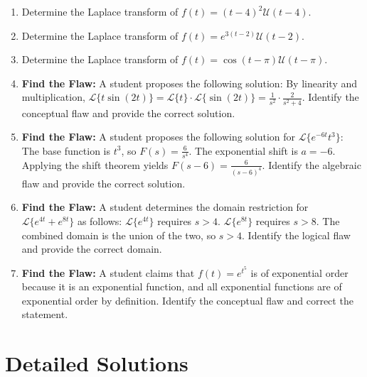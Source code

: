\documentclass[11pt, letterpaper]{article}
\theoremstyle{definition}
\theoremstyle{remark}
\begin{document}
\begin{enumerate}[label=\textbf{Problem \arabic*.}, leftmargin=*]
    \item Determine the Laplace transform of $f(t) = (t-4)^2 \mathcal{U}(t-4)$.
    
    \item Determine the Laplace transform of $f(t) = e^{3(t-2)} \mathcal{U}(t-2)$.
    
    \item Determine the Laplace transform of $f(t) = \cos(t-\pi) \mathcal{U}(t-\pi)$.
    
    \item \textbf{Find the Flaw:} A student proposes the following solution: 
    By linearity and multiplication, $\mathscr{L}\{t \sin(2t)\} = \mathscr{L}\{t\} \cdot \mathscr{L}\{\sin(2t)\} = \frac{1}{s^2} \cdot \frac{2}{s^2+4}$. 
    Identify the conceptual flaw and provide the correct solution.
    
    \item \textbf{Find the Flaw:} A student proposes the following solution for $\mathscr{L}\{e^{-6t} t^3\}$: 
    The base function is $t^3$, so $F(s) = \frac{6}{s^4}$. The exponential shift is $a = -6$. Applying the shift theorem yields $F(s-6) = \frac{6}{(s-6)^4}$. 
    Identify the algebraic flaw and provide the correct solution.
    
    \item \textbf{Find the Flaw:} A student determines the domain restriction for $\mathscr{L}\{e^{4t} + e^{8t}\}$ as follows: 
    $\mathscr{L}\{e^{4t}\}$ requires $s > 4$. $\mathscr{L}\{e^{8t}\}$ requires $s > 8$. The combined domain is the union of the two, so $s > 4$. 
    Identify the logical flaw and provide the correct domain.
    
    \item \textbf{Find the Flaw:} A student claims that $f(t) = e^{t^5}$ is of exponential order because it is an exponential function, and all exponential functions are of exponential order by definition. 
    Identify the conceptual flaw and correct the statement.

\end{enumerate}

\newpage

\section{Detailed Solutions}
\end{document}
